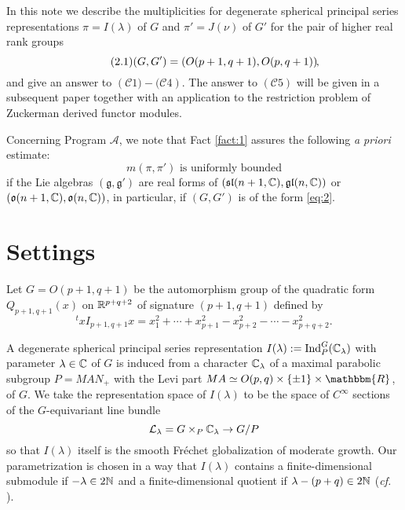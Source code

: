 \documentclass[reqno,12pt]{pja00} %
\newcommand{\assign}{:=}
\newcommand{\tmop}[1]{\ensuremath{\operatorname{#1}}}
\newcommand{\Ind}{\mbox{\normalfont Ind}}
\theoremstyle{definition}
\theoremstyle{exampstyle} \newtheorem{examp}[theorem]{Theorem}
\newcommand{\tmtextbf}[1]{{\bfseries{#1}}}
\begin{document}

In this note we describe the multiplicities for degenerate spherical principal series representations $\pi=I(\lambda)$ of $G$ and $\pi'=J(\nu)$ of $G'$ for the pair
of higher real rank groups\begin{equation}\tag{2.1}\label{eq:2}
	(G,G')=\left( O(p+1,q+1),O(p,q+1) \right)\kern-0.1cm,
\end{equation}
and give an answer to $\left( \mathcal{C}1)-(\mathcal{C}4 \right)$. The answer to $\left( \mathcal{C}5 \right)$ will be given
in a subsequent paper together with an application to the restriction problem of Zuckerman derived functor modules.

Concerning Program $\mathcal{A}$, we note that Fact \ref{fact:1} assures the following {\it a priori} estimate:\begin{equation*}
	m(\pi,\pi')\mbox{ is uniformly bounded}
\end{equation*}
if the Lie algebras $(\mathfrak{g},\mathfrak{g}')$ are real forms of $(\mathfrak{sl}(n+1,\mathbb{C}),\mathfrak{gl}(n,\mathbb{C}))$
or $(\mathfrak{o}(n+1,\mathbb{C}),\mathfrak{o}(n,\mathbb{C}))$, in particular, if $(G,G')$ is of the form \eqref{eq:2}.
\section{Settings}
Let $G=O(p+1,q+1)$ be the automorphism group of the quadratic form
$Q_{p+1,q+1}(x)$ on $\mathbb{R}^{p+q+2}$ of signature $(p+1,q+1)$ defined by
\begin{equation*}
		^t\!xI_{p+1,q+1}x
		=x_1^2+\cdots+x_{p+1}^2-x_{p+2}^2-\cdots-x_{p+q+2}^2.
\end{equation*}

A degenerate spherical principal series representation $I(\lambda):=\Ind_P^G(\C_{\lambda})$ with parameter $\lambda\in\mathbb{C}$ of $G$ is induced from
a character $\mathbb{C}_\lambda$ of a maximal parabolic subgroup $P=MAN_+$
with the Levi part
$M A \simeq O (p, q) \times \{ \pm 1 \} \times \mathbbm{R}$, of $G$.
We take the representation space of $I(\lambda)$ to be the space of $C^\infty$ sections
of the $G$-equivariant line bundle\[
	\mathcal{L}_\lambda=G\times_{P}\mathbb{C}_\lambda\to G/P
\]
so that $I(\lambda)$ itself is the smooth Fr\'echet globalization of moderate growth.
Our parametrization is chosen in a way that
$I(\lambda)$ contains a finite-dimensional submodule if $-\lambda\in2\mathbb{N}$ and a finite-dimensional quotient if $\lambda-\left( p+q\right)\in2\mathbb{N}$ ({\it cf.} \cite{howe1993homogeneous}).
\end{document}
